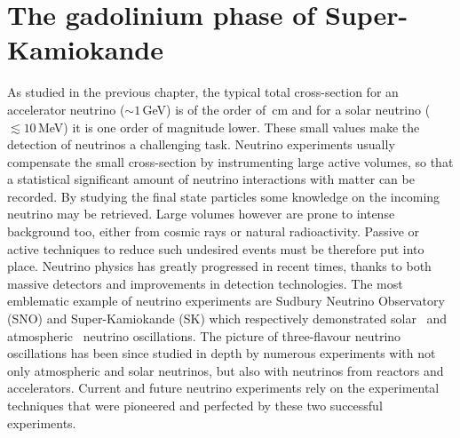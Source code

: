 \chapter{The gadolinium phase of Super-Kamiokande}
\label{cha:skgd}

As studied in the previous chapter, the typical total cross-section for an accelerator neutrino \mbox{($\sim1$\,GeV)} %
is of the order of \,cm and for a solar neutrino ($\lesssim10$\,MeV) %
it is one order of magnitude lower.
These small values make the detection of neutrinos a challenging task.
Neutrino experiments usually compensate the small cross-section by instrumenting large active volumes, %
so that a statistical significant amount of neutrino interactions with matter can be recorded.
By studying the final state particles some knowledge on the incoming neutrino may be retrieved.
Large volumes however are prone to intense background too, either from cosmic rays or natural radioactivity.
Passive or active techniques to reduce such undesired events must be therefore put into place.
Neutrino physics has greatly progressed in recent times, thanks to both massive detectors and %
improvements in detection technologies.
The most emblematic example of neutrino experiments are Sudbury Neutrino Observatory (SNO) and Super-Kamiokande (SK) %
which respectively demonstrated solar~\cite{Aharmim:2005gt} and atmospheric~\cite{Fukuda:1998mi} neutrino oscillations.
The picture of three-flavour neutrino oscillations has been since studied in depth %
by numerous experiments with not only atmospheric and solar neutrinos, but also with neutrinos from reactors and accelerators.
Current and future neutrino experiments rely on the experimental techniques that were pioneered and perfected %
by these two successful experiments.

